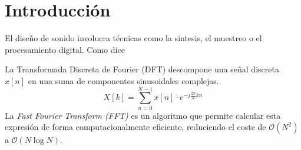 \chapter{Introducción}

El diseño de sonido involucra técnicas como la \gls{sintesis}, el muestreo o el procesamiento digital. Como dice \cite{bovermannComputation}
\textcite{bovermannComputation}


La Transformada Discreta de Fourier (DFT) descompone una señal discreta $x[n]$ en una suma de componentes sinusoidales complejas. 
$$X[k] = \sum_{n=0}^{N-1} x[n] \cdot e^{-j \frac{2\pi}{N}kn} $$
La \textit{Fast Fourier Transform (FFT)} es un algoritmo que permite calcular esta expresión de forma computacionalmente eficiente, reduciendo el \gls{coste} de $\mathcal{O}(N^2)$ a $\mathcal{O}(N \log N)$.
